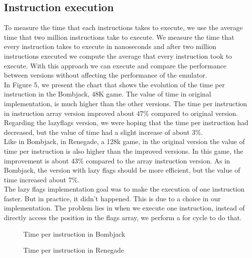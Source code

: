 \subsection{Instruction execution}
To measure the time that each instructions takes to execute, we use the average time that two million instructions take to execute. We measure the time that every instruction takes to execute in nanoseconds and after two million instructions executed we compute the average that every instruction took to execute. With this approach we can execute and compare the performance between versions without affecting the performance of the emulator.\\
\indent In Figure 5, we present the chart that shows the evolution of the time per instruction in the Bombjack, 48K game. The value of time in original implementation, is much higher than the other versions. The time per instruction in instruction array version improved about 47\% compared to original version. Regarding the lazyflags version, we were hoping that the time per instruction had decreased, but the value of time had a slight increase of about 3\%.\\
\indent Like in Bombjack, in Renegade, a 128k game, in the original version the value of time per instruction is also higher than the improved versions. In this game, the improvement is about 43\% compared to the array instruction version. As in Bombjack, the version with lazy flags should be more efficient, but the value of time increased about 7\%.\\
\indent The lazy flags implementation goal was to make the execution of one instruction faster. But in practice, it didn't happened. This is due to a choice in our implementation. The problem lies in when we execute one instruction, instead of directly access the position in the flags array, we perform a for cycle to do that.
\begin{figure}[h]
	\caption{Time per instruction in Bombjack}
\end{figure}
\begin{figure}[h]
	\caption{Time per instruction in Renegade}
\end{figure}
